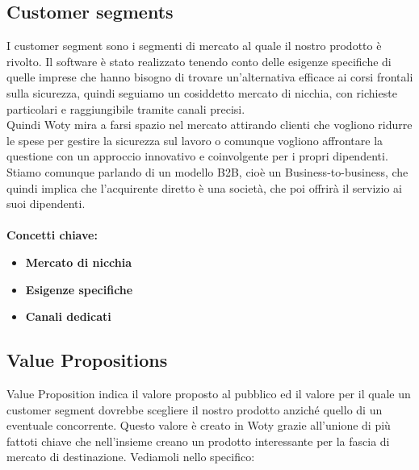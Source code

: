 \subsection{Customer segments}
I customer segment sono i segmenti di mercato al quale il nostro prodotto è rivolto. Il software è stato realizzato tenendo conto delle esigenze specifiche di quelle imprese che hanno bisogno di trovare un'alternativa efficace ai corsi frontali sulla sicurezza, quindi seguiamo un cosiddetto mercato di nicchia, con richieste particolari e raggiungibile tramite canali precisi. \\
Quindi Woty mira a farsi spazio nel mercato attirando clienti che vogliono ridurre le spese per gestire la sicurezza sul lavoro o comunque vogliono affrontare la questione con un approccio innovativo e coinvolgente per i propri dipendenti. \\
Stiamo comunque parlando di un modello B2B, cioè un Business-to-business, che quindi implica che l'acquirente diretto è una società, che poi offrirà il servizio ai suoi dipendenti.\\
\\ \textbf{Concetti chiave:}
\begin{itemize}
\item \textbf{Mercato di nicchia}
\item \textbf{Esigenze specifiche}
\item \textbf{Canali dedicati}
\end{itemize}

\subsection{Value Propositions}
Value Proposition indica il valore proposto al pubblico ed il valore per il quale un customer segment dovrebbe scegliere il nostro prodotto anziché quello di un eventuale concorrente. Questo valore è creato in Woty grazie all'unione di più fattoti chiave che nell'insieme creano un prodotto interessante per la fascia di mercato di destinazione. Vediamoli nello specifico:

